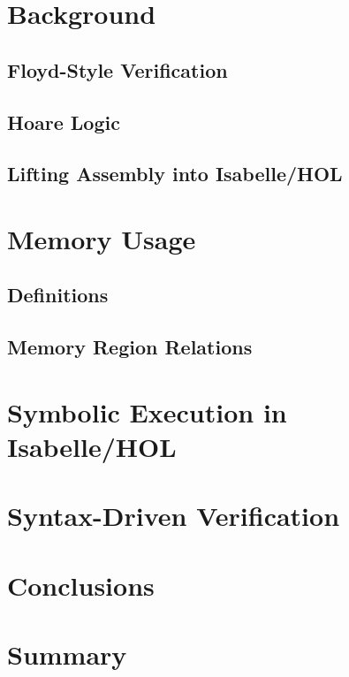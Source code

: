 \documentclass[draft,nopageskip,prelim]{VTthesis} %
\begin{document}
  \chapter{Background} \label{ch:background}
  \section{Floyd-Style Verification}\label{ch:floyd}
  \section{Hoare Logic}
  \section{Lifting Assembly into Isabelle/HOL}
  
  \chapter{Memory Usage}
  \section{Definitions}
  \section{Memory Region Relations}
  
  \chapter{Symbolic Execution in Isabelle/HOL}
  
  
  
  \chapter{Syntax-Driven Verification} %

	\chapter{Conclusions}\label{ch:conclusions}
	\chapter{Summary}\label{ch:summary} %

	
	

	\appendix
\end{document}

